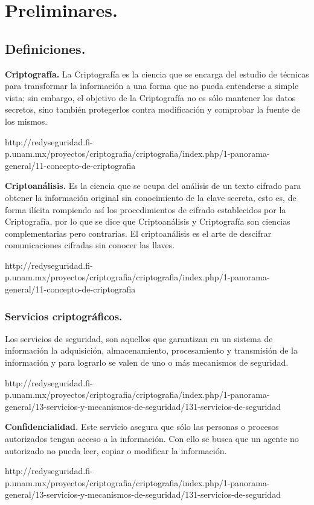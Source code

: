 \chapter{Preliminares. } %

\section{Definiciones. }
\textbf{Criptografía. }
La Criptografía es la ciencia que se encarga del estudio de técnicas para transformar la información a una forma que no pueda entenderse a simple vista; sin embargo, el objetivo de la Criptografía no es sólo mantener los datos secretos, sino también protegerlos contra modificación y comprobar la fuente de los mismos.

http://redyseguridad.fi-p.unam.mx/proyectos/criptografia/criptografia/index.php/1-panorama-general/11-concepto-de-criptografia


\textbf{Criptoanálisis. }
Es la ciencia que se ocupa del análisis de un texto cifrado para obtener la información original sin conocimiento de la clave secreta, esto es, de forma ilícita rompiendo así los procedimientos de cifrado establecidos por la Criptografía, por lo que se dice que Criptoanálisis y Criptografía son ciencias complementarias pero contrarias.
El criptoanálisis es el arte de descifrar comunicaciones cifradas sin conocer las llaves.

http://redyseguridad.fi-p.unam.mx/proyectos/criptografia/criptografia/index.php/1-panorama-general/11-concepto-de-criptografia

\subsection{Servicios criptográficos. }
Los servicios de seguridad, son aquellos que garantizan en un sistema de información la adquisición, almacenamiento, procesamiento y transmisión de la información y para lograrlo se valen de uno o más mecanismos de seguridad.

http://redyseguridad.fi-p.unam.mx/proyectos/criptografia/criptografia/index.php/1-panorama-general/13-servicios-y-mecanismos-de-seguridad/131-servicios-de-seguridad

\textbf{Confidencialidad. }
Este servicio asegura que sólo las personas o procesos autorizados tengan acceso a la información. Con ello se busca que un agente no autorizado no pueda leer, copiar o modificar la información.

http://redyseguridad.fi-p.unam.mx/proyectos/criptografia/criptografia/index.php/1-panorama-general/13-servicios-y-mecanismos-de-seguridad/131-servicios-de-seguridad

